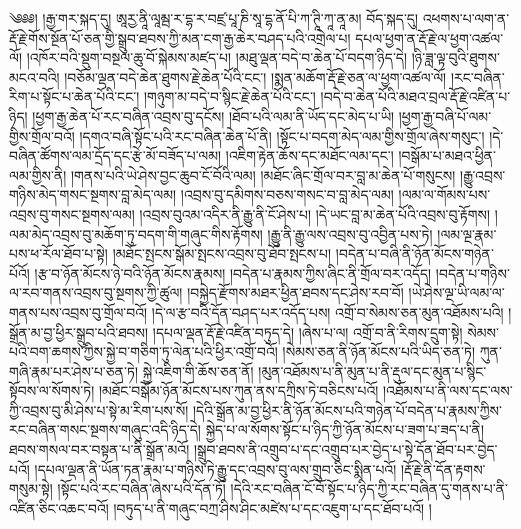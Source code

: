 \setcounter{footnote}{0} 
༄༅༅། །རྒྱ་གར་སྐད་དུ། ཨཱརྱ་ནཱི་ལཱམྦ་ར་དྷ་ར་བཛྲ་པཱ་ཎི་སཱ་དྷ་ནོ་པི་ཀ་ཊཱི་ཀཱ་ནཱ་མ། བོད་སྐད་དུ། འཕགས་པ་ལག་ན་རྡོ་རྗེ་གོས་སྔོན་པོ་ཅན་གྱི་སྒྲུབ་ཐབས་ཀྱི་མན་ངག་རྒྱ་ཆེར་བཤད་པའི་འགྲེལ་པ། དཔལ་ཕྱག་ན་རྡོ་རྗེ་ལ་ཕྱག་འཚལ་ལོ། །འཁོར་བའི་སྡུག་བསྔལ་ཆུ་བོ་སྐེམས་མཛད་པ། །མཐུ་ལྡན་བདེ་བ་ཆེན་པོ་བདག་ཉིད་དེ། །ཉི་ཟླ་ལྟ་བུའི་ཐུགས་མངའ་བའི། །བཅོམ་ལྡན་བདེ་ཆེན་ཐུགས་རྗེ་ཆེན་པོའི་ངང་། །སྨན་མཆོག་རྡོ་རྗེ་ཅན་ལ་ཕྱག་འཚལ་ལོ། །རང་བཞིན་རིག་པ་སྟོང་པ་ཆེན་པོའི་ངང་། །གཉུག་མ་བདེ་བ་སྙིང་རྗེ་ཆེན་པོའི་ངང་། །བདེ་བ་ཆེན་པོའི་མཐའ་བྲལ་རྡོ་རྗེ་འཛིན་པ་ཉིད། །ཕྱག་རྒྱ་ཆེན་པོ་རང་བཞིན་འབྲས་བུ་དངོས། །ཐོབ་པའི་ལམ་ནི་ཡོད་དང་མེད་པ་ཡི། །ཕྱག་རྒྱ་བཞི་པོ་ལམ་གྱིས་གྲོལ་བའོ། །དགའ་བཞི་སྟོང་པའི་རང་བཞིན་ཆེན་པོ་ནི། །སྟོང་པ་བདག་མེད་ལམ་གྱིས་གྲོལ་ཞེས་གསུང་། །དེ་བཞིན་ཚོགས་ལམ་དྲོད་དང་རྩེ་མོ་བཟོད་པ་ལམ། །འཇིག་རྟེན་ཆོས་དང་མཐོང་ལམ་དང་། །བསྒོམ་པ་མཐའ་ཕྱིན་ལམ་གྱིས་ནི། །གནས་པའི་ཡེ་ཤེས་བྱང་ཆུབ་ངོ་བོའི་ལམ། །མཐོང་ཞིང་གྲོལ་བར་བླ་མ་ཆེན་པོ་གསུངས། །རྒྱུ་འབྲས་གཉིས་མེད་གསང་སྔགས་བླ་མེད་ལམ། །འབྲས་བུ་དམིགས་བཅས་གསང་བ་བླ་མེད་ལམ། །ལམ་ལ་གོམས་པས་འབྲས་བུ་གསང་སྔགས་ལམ། །འབྲས་བུའམ་འདིར་ནི་རྒྱུ་ནི་ངོ་ཤེས་པ། །དེ་ཡང་བླ་མ་ཆེན་པོའི་འབྲས་བུ་རྟོགས། །ལམ་མེད་འབྲས་བུ་མཆོག་ཏུ་བདག་གི་གཞུང་གིས་རྟོགས། །རྒྱུ་ནི་རྒྱུ་ལས་འབྲས་བུ་འབྱིན་པས་ཏེ། །ལམ་ལྔ་རྣམ་པས་ཕ་རོལ་ཐོབ་པ་སྟེ། །མཐོང་སྤངས་སྒོམ་སྤངས་འབྲས་བུ་ཐོབ་སྤངས་པ། །བདེན་པ་བཞི་ནི་ཉོན་མོངས་གཉེན་པོའོ། །རྩ་བ་ཉོན་མོངས་ཉེ་བའི་ཉོན་མོངས་རྣམས། །བདེན་པ་རྣམས་ཀྱིས་ཞིང་ནི་གྲོལ་བར་འདོད། །བདེན་པ་གཉིས་ལ་རབ་གནས་འབྲས་བུ་སྔགས་ཀྱི་ཚུལ། །བསྐྱེད་རྫོགས་མཐར་ཕྱིན་ཐབས་དང་ཤེས་རབ་བོ། །ཡེ་ཤེས་ལྔ་ཡི་ལམ་ལ་གནས་པས་འབྲས་བུ་གྲོལ་བའོ། །དེ་ལ་རྩ་བའི་དོན་བཤད་པར་འདོད་པས། འགྲོ་བ་སེམས་ཅན་མུན་འཐོམས་པའི། །སྒྲོན་མ་བྱ་ཕྱིར་སྒྲུབ་པའི་ཐབས། །དཔལ་ལྡན་རྡོ་རྗེ་འཛིན་བཏུད་དེ། །ཞེས་པ་ལ། འགྲོ་བ་ནི་རིགས་དྲུག་སྟེ། སེམས་པའི་བག་ཆགས་ཀྱིས་སྐྱེ་བ་གཅིག་ཏུ་ལེན་པའི་ཕྱིར་འགྲོ་བའོ། །སེམས་ཅན་ནི་ཉོན་མོངས་པའི་ཡིད་ཅན་ཏེ། ཀུན་གཞི་རྣམ་པར་ཤེས་པ་ཅན་ཏེ། སྐྱེ་འཇིག་གི་ཆོས་ཅན་ནོ། །མུན་འཐོམས་པ་ནི་མུན་པ་ནི་རྡུལ་དང་མུན་པ་སྙིང་སྟོབས་ལ་སོགས་ཏེ། །མཐོང་བསྒོམ་ཉོན་མོངས་པས་ཀུན་ནས་དཀྲིས་ཏེ་བཅིངས་པའོ། །འཐོམས་པ་ནི་ལས་དང་ལས་ཀྱི་འབྲས་བུ་མི་ཤེས་པ་སྟེ་མ་རིག་པས་སོ། །དེའི་སྒྲོན་མ་བྱ་ཕྱིར་ནི་ཉོན་མོངས་པའི་གཉེན་པོ་བདེན་པ་རྣམས་ཀྱིས་རང་བཞིན་གསང་སྔགས་གཞུང་འདི་ཉིད་དེ། སྐྱེད་པ་ལ་སོགས་སྟོང་པ་ཉིད་ཀྱི་ཉོན་མོངས་པ་ཟག་པ་ཟད་པ་ནི། ཐབས་གསལ་བར་བསྟན་པ་ནི་སྒྲོན་མའོ། །སྒྲུབ་ཐབས་ནི་འགྲུབ་པ་དང་འགྲུབ་པར་བྱེད་པ་སྟེ་དོན་ཐོབ་པར་བྱེད་པའོ། །དཔལ་ལྡན་ནི་ཡོན་ཏན་རྣམ་པ་གཉིས་ཏེ་རྒྱུ་དང་འབྲས་བུ་ལས་གྲུབ་ཅིང་སྨིན་པའོ། །རྡོ་རྗེ་ནི་དོན་རྟགས་གསུམ་སྟེ། །སྟོང་པའི་རང་བཞིན་ཞེས་པའི་དོན་ཏོ། །དེའི་རང་བཞིན་ངོ་བོ་སྟོང་པ་ཉིད་ཀྱི་རང་བཞིན་དུ་གནས་པ་ནི་འཛིན་ཅིང་འཆང་བའོ། །བཏུད་པ་ནི་གཞུང་བཀྲ་ཤིས་ཤིང་མཛེས་པ་དང་འཇུག་པ་དང་ཐོབ་པའོ། །
